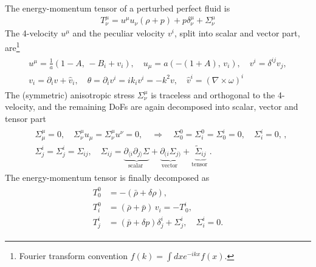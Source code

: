 The energy-momentum tensor of a perturbed perfect fluid is
\begin{align}\label{eq:em_tensor_fluid_perturbed}
    T^\mu_\nu= u^\mu u_\nu (\rho+p) + p \delta^\mu_\nu + \Sigma^\mu_\nu
\end{align}
The 4-velocity $u^\mu$ and the peculiar velocity $v^i$, split into scalar and vector part, are\footnote{Fourier transform convention $f(k)=\int dx e^{-ikx}f(x)$.}
{\small\begin{align}\label{eq:velocity_decomposition}
\begin{aligned}
    u^\mu=\frac{1}{a}\left(1-A,\,-B_i+v_i\right),\quad u_\mu=a\left(-(1+A),\,v_i\right),\quad v^i=\delta^{ij}v_j,\\[2pt]
    v_i=\partial_i v + \hat{v}_i, \quad \theta= \partial_i v^i = ik_i v^i = -k^2 v, \quad \hat{v}^i=(\nabla\times \omega)^i
\end{aligned}\end{align}}
The (symmetric) anisotropic stress $\Sigma^\mu_\nu$ is traceless and orthogonal to the 4-velocity, and the remaining DoFs are again decomposed into scalar, vector and tensor part
{\small\begin{align}\label{eq:anisotropic_stress_decomposition}
\begin{aligned}
    &\Sigma^\mu_\mu=0,\quad \Sigma^\mu_\nu u_\mu=\Sigma^\mu_\nu u^\nu=0, \quad \Rightarrow\quad \Sigma^0_0=\Sigma^0_i=\Sigma^i_0=0, \quad \Sigma^i_i=0, \,,\\[3pt]
    &\Sigma^i_j=\Sigma^i_j =\Sigma_{ij},\quad
    \Sigma_{i j}=\underbrace{\partial_{\langle i} \partial_{j\rangle} \Sigma}_{\text {scalar }}+\underbrace{\partial_{(i} \hat{\Sigma}_{j)}}_{\text {vector }}+\underbrace{\tilde{\Sigma}_{i j}}_{\text {tensor }}.
\end{aligned}
\end{align}}
The energy-momentum tensor is finally decomposed as
\begin{align}\label{eq:energy_momentum_tensor_decomposition}
\begin{aligned}
    T_{0}^{0} & =-(\bar{\rho}+\delta \rho), \\
    T_{i}^{0} & =(\bar{\rho}+\bar{p}) \,v_{i}=-T_{\,0}^{i}, \\
    T_{j}^{i} & =(\bar{p}+\delta p) \delta_{j}^{i}+\Sigma_{j}^{i}, \quad \Sigma_{i}^{i}=0.
\end{aligned}
\end{align}


